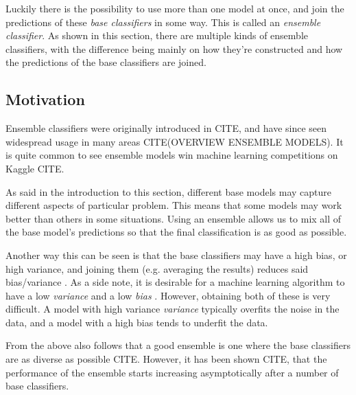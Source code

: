 \documentclass[epsfig,a4paper,11pt,titlepage,twoside,openany]{book}
\begin{document}
Luckily there is the possibility to use more than one model at once, and join the predictions of these \textit{base classifiers} in some way. This is called an \textit{ensemble classifier}. As shown in this section, there are multiple kinds of ensemble classifiers, with the difference being mainly on how they're constructed and how the predictions of the base classifiers are joined.




\subsection{Motivation} 
\label{sec:motivation-ensemble}

Ensemble classifiers were originally introduced in CITE, and have since seen widespread usage in many areas CITE(OVERVIEW ENSEMBLE MODELS). It is quite common to see ensemble models win machine learning competitions on Kaggle CITE. 

As said in the introduction to this section, different base models may capture different aspects of particular problem. This means that some models may work better than others in some situations. Using an ensemble allows us to mix all of the base model's predictions so that the final classification is as good as possible. 

Another way this can be seen is that the base classifiers may have a high bias, or high variance, and joining them (e.g. averaging the results) reduces said bias/variance \cite{Breiman1996_bagging_predictors}. As a side note, it is desirable for a machine learning algorithm to have a low \textit{variance} and a low \textit{bias} \cite{Munro2011_bias_variance_decomp}. However, obtaining both of these is very difficult. A model with high variance \textit{variance} typically overfits the noise in the data, and a model with a high bias tends to underfit the data. 

From the above also follows that a good ensemble is one where the base classifiers are as diverse as possible CITE. However, it has been shown CITE, that the performance of the ensemble starts increasing asymptotically after a number of base classifiers. 
\end{document}
